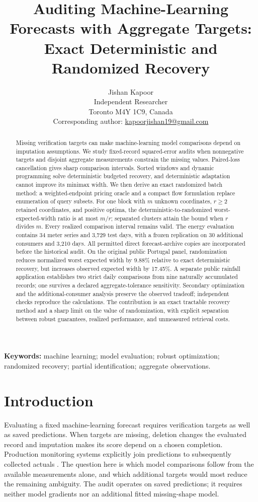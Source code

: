 \documentclass[12pt]{article}
\title{Auditing Machine-Learning Forecasts with Aggregate Targets: Exact Deterministic and Randomized Recovery}
\author{Jishan Kapoor\\
Independent Researcher\\
Toronto M4Y 1C9, Canada\\
Corresponding author: \href{mailto:kapoorjishan19@gmail.com}{kapoorjishan19@gmail.com}}
\date{}
\begin{document}
\maketitle

\begin{abstract}
Missing verification targets can make machine-learning model comparisons
depend on imputation assumptions. We study fixed-record squared-error audits
when nonnegative targets and disjoint aggregate measurements constrain the
missing values. Paired-loss cancellation gives sharp comparison intervals.
Sorted windows and dynamic programming solve deterministic budgeted recovery,
and deterministic adaptation cannot improve its minimax width. We then
derive an exact randomized batch method: a weighted-endpoint pricing oracle
and a compact flow formulation replace enumeration of query subsets. For one
block with $m$ unknown coordinates, $r\geq2$ retained coordinates, and positive optima, the
deterministic-to-randomized worst-expected-width ratio is at most $m/r$;
separated clusters attain the bound when $r$ divides $m$. Every realized
comparison interval remains valid. The energy evaluation contains 34 meter
series and 3,729 test days, with a frozen replication on 30 additional
consumers and 3,210 days. All permitted direct forecast-archive copies are
incorporated before the historical audit. On the original public Portugal
panel, randomization reduces normalized worst expected width by 9.88\%
relative to exact deterministic recovery, but increases observed expected
width by 17.45\%. A separate public rainfall application establishes two
strict daily comparisons from nine naturally accumulated records; one
survives a declared aggregate-tolerance sensitivity. Secondary optimization
and the additional-consumer analysis preserve the observed tradeoff;
independent checks reproduce the calculations. The contribution is an exact tractable recovery method and a
sharp limit on the value of randomization, with explicit separation between
robust guarantees, realized performance, and unmeasured retrieval costs.
\end{abstract}
\noindent\textbf{Keywords:} machine learning; model evaluation; robust optimization;
randomized recovery; partial identification; aggregate observations.

\section{Introduction}
Evaluating a fixed machine-learning forecast requires verification targets
as well as saved predictions. When targets are missing, deletion changes
the evaluated record and imputation makes its score depend on a chosen
completion. Production monitoring systems explicitly join predictions to
subsequently collected actuals \cite{azuremonitor,awsmonitor}. The question
here is which model comparisons follow from the available measurements
alone, and which additional targets would most reduce the remaining ambiguity.
The audit operates on saved predictions; it requires neither model gradients
nor an additional fitted missing-shape model.
\end{document}
